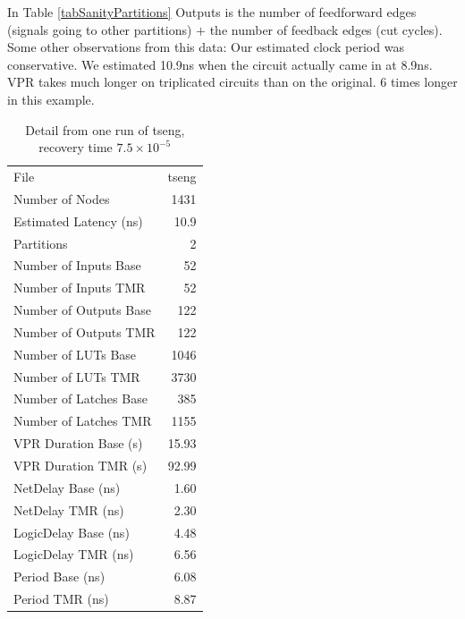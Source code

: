\documentclass[12pt,final,oneside,a4paper]{dwThesis} %
\begin{document}
    In Table \ref{tabSanityPartitions}
   Outputs is the number of feedforward edges (signals going to other
   partitions) $+$ the number of feedback edges (cut cycles). Some other observations
   from this data: Our estimated clock period was conservative. We estimated
   10.9ns when the circuit actually came in at 8.9ns.  \gls{VPR} takes much
   longer on triplicated circuits than on the original. 6 times longer in this
   example.  
   \begin{table}
      \begin{center}

      \begin{tabular}
         {lr} \toprule File & tseng\\

         Number of Nodes & 1431\\
         Estimated Latency (ns)& 10.9\\
         Partitions &
         2\\
         Number of Inputs Base & 52\\
         Number of Inputs TMR & 52\\
         Number of
         Outputs Base & 122\\
         Number of Outputs TMR & 122\\
         Number of LUTs Base
         & 1046\\
         Number of LUTs TMR & 3730\\
         Number of Latches Base & 385\\

         Number of Latches TMR & 1155\\
         VPR Duration Base (s) & 15.93\\
         VPR
         Duration TMR (s) & 92.99\\
         NetDelay Base (ns) & 1.60\\
         NetDelay TMR
         (ns) & 2.30\\
         LogicDelay Base (ns) & 4.48\\
         LogicDelay TMR (ns) &
         6.56\\
         Period Base (ns) & 6.08\\
         Period TMR (ns) & 8.87\\
         \bottomrule

      \end{tabular}
      \caption{Detail from one run of tseng, recovery time
         $7.5\times10^{-5}$}\label{tabSanity} 
   \end{center}\end{table}
\end{document}
